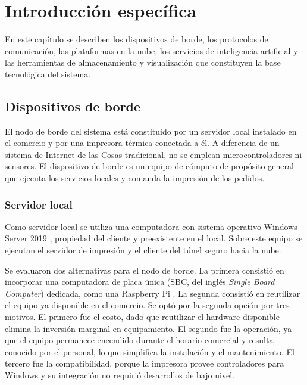 
\chapter{Introducción específica} %

\label{Chapter2} %

En este capítulo se describen los dispositivos de borde, los protocolos de comunicación, las plataformas en la nube, los servicios de inteligencia artificial y las herramientas de almacenamiento y visualización que constituyen la base tecnológica del sistema.


\section{Dispositivos de borde}
\label{sec:dispositivos_borde}

El nodo de borde del sistema está constituido por un servidor local instalado en el comercio y por una impresora térmica conectada a él. A diferencia de un sistema de Internet de las Cosas tradicional, no se emplean microcontroladores ni sensores. El dispositivo de borde es un equipo de cómputo de propósito general que ejecuta los servicios locales y comanda la impresión de los pedidos.

\subsection{Servidor local}
\label{subsec:servidor_local}

Como servidor local se utiliza una computadora con sistema operativo Windows Server 2019 \cite{windowsserver}, propiedad del cliente y preexistente en el local. Sobre este equipo se ejecutan el servidor de impresión y el cliente del túnel seguro hacia la nube.

Se evaluaron dos alternativas para el nodo de borde. La primera consistió en incorporar una computadora de placa única (SBC, del inglés \textit{Single Board Computer}) dedicada, como una Raspberry Pi \cite{raspberrypi}. La segunda consistió en reutilizar el equipo ya disponible en el comercio. Se optó por la segunda opción por tres motivos. El primero fue el costo, dado que reutilizar el hardware disponible elimina la inversión marginal en equipamiento. El segundo fue la operación, ya que el equipo permanece encendido durante el horario comercial y resulta conocido por el personal, lo que simplifica la instalación y el mantenimiento. El tercero fue la compatibilidad, porque la impresora provee controladores para Windows y su integración no requirió desarrollos de bajo nivel.

